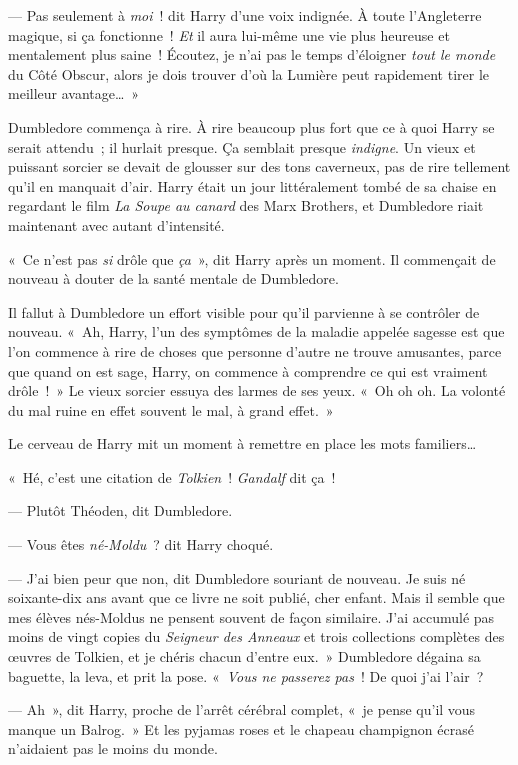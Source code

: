 --- Pas seulement à \emph{moi}~! dit Harry d'une voix indignée. À toute l'Angleterre magique, si ça fonctionne~! \emph{Et} il aura lui-même une vie plus heureuse et mentalement plus saine~! Écoutez, je n'ai pas le temps d'éloigner \emph{tout le monde} du Côté Obscur, alors je dois trouver d'où la Lumière peut rapidement tirer le meilleur avantage…~»

Dumbledore commença à rire. À rire beaucoup plus fort que ce à quoi Harry se serait attendu~; il hurlait presque. Ça semblait presque \emph{indigne}. Un vieux et puissant sorcier se devait de glousser sur des tons caverneux, pas de rire tellement qu'il en manquait d'air. Harry était un jour littéralement tombé de sa chaise en regardant le film \emph{La Soupe au canard} des Marx Brothers, et Dumbledore riait maintenant avec autant d'intensité.

«~Ce n'est pas \emph{si} drôle que \emph{ça}~», dit Harry après un moment. Il commençait de nouveau à douter de la santé mentale de Dumbledore.

Il fallut à Dumbledore un effort visible pour qu'il parvienne à se contrôler de nouveau. «~Ah, Harry, l'un des symptômes de la maladie appelée sagesse est que l'on commence à rire de choses que personne d'autre ne trouve amusantes, parce que quand on est sage, Harry, on commence à comprendre ce qui est vraiment drôle~!~» Le vieux sorcier essuya des larmes de ses yeux. «~Oh oh oh. La volonté du mal ruine en effet souvent le mal, à grand effet.~»

Le cerveau de Harry mit un moment à remettre en place les mots familiers…

«~Hé, c'est une citation de \emph{Tolkien}~! \emph{Gandalf} dit ça~!

--- Plutôt Théoden, dit Dumbledore.

--- Vous êtes \emph{né-Moldu}~? dit Harry choqué.

--- J'ai bien peur que non, dit Dumbledore souriant de nouveau. Je suis né soixante-dix ans avant que ce livre ne soit publié, cher enfant. Mais il semble que mes élèves nés-Moldus ne pensent souvent de façon similaire. J'ai accumulé pas moins de vingt copies du \emph{Seigneur des Anneaux} et trois collections complètes des œuvres de Tolkien, et je chéris chacun d'entre eux.~» Dumbledore dégaina sa baguette, la leva, et prit la pose. «~\emph{Vous ne passerez pas}~! De quoi j'ai l'air~?

--- Ah~», dit Harry, proche de l'arrêt cérébral complet, «~je pense qu'il vous manque un Balrog.~» Et les pyjamas roses et le chapeau champignon écrasé n'aidaient pas le moins du monde.

